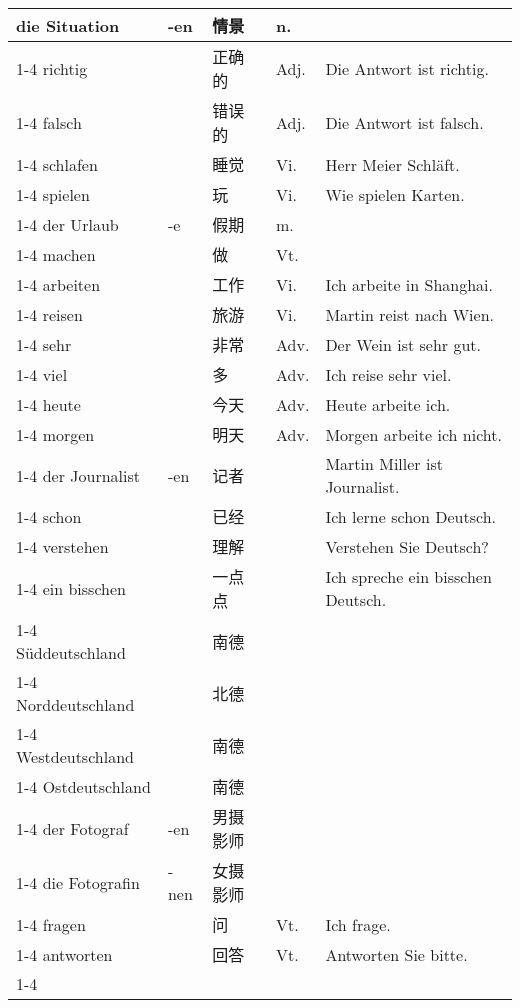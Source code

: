 \documentclass[hidelinks]{ctexart}
\newcommand{\gvocabcline}{\cline{1-4}}
\begin{document}
\begin{longtable}{lllll}
    die Situation & -en & 情景 & n. \\
    \gvocabcline
    richtig & & 正确的 & Adj. & Die Antwort ist richtig. \\
    \gvocabcline
    falsch & & 错误的 & Adj. & Die Antwort ist falsch. \\
    \gvocabcline
    schlafen & & 睡觉 & Vi. & Herr Meier Schl\"aft. \\
    \gvocabcline
    spielen & & 玩 & Vi. & Wie spielen Karten. \\
    \gvocabcline
    der Urlaub & -e & 假期 & m. \\
    \gvocabcline
    machen & & 做 & Vt. \\
    \gvocabcline
    arbeiten & & 工作 & Vi. & Ich arbeite in Shanghai. \\
    \gvocabcline
    reisen & & 旅游 & Vi. & Martin reist nach Wien. \\
    \gvocabcline
    sehr & & 非常 & Adv. & Der Wein ist sehr gut. \\
    \gvocabcline
    viel & & 多 & Adv.& Ich reise sehr viel. \\
    \gvocabcline
    heute & & 今天 & Adv. & Heute arbeite ich. \\
    \gvocabcline
    morgen & & 明天 & Adv. & Morgen arbeite ich nicht. \\
    \gvocabcline
    der Journalist & -en & 记者 & & Martin Miller ist Journalist. \\
    \gvocabcline
    schon & & 已经 & & Ich lerne schon Deutsch. \\
    \gvocabcline
    verstehen & & 理解 & & Verstehen Sie Deutsch? \\
    \gvocabcline
    ein bisschen & & 一点点  & & Ich spreche ein bisschen Deutsch. \\
    \gvocabcline
    S\"uddeutschland & & 南德 \\
    \gvocabcline
    Norddeutschland & & 北德 \\
    \gvocabcline
    Westdeutschland & & 南德 \\
    \gvocabcline
    Ostdeutschland & & 南德 \\
    \gvocabcline
    der Fotograf & -en & 男摄影师 \\
    \gvocabcline
    die Fotografin & -nen & 女摄影师 \\
    \gvocabcline
    fragen & & 问 & Vt. & Ich frage. \\
    \gvocabcline
    antworten & & 回答 & Vt. & Antworten Sie bitte. \\
    \gvocabcline

\end{longtable}
\end{document}
